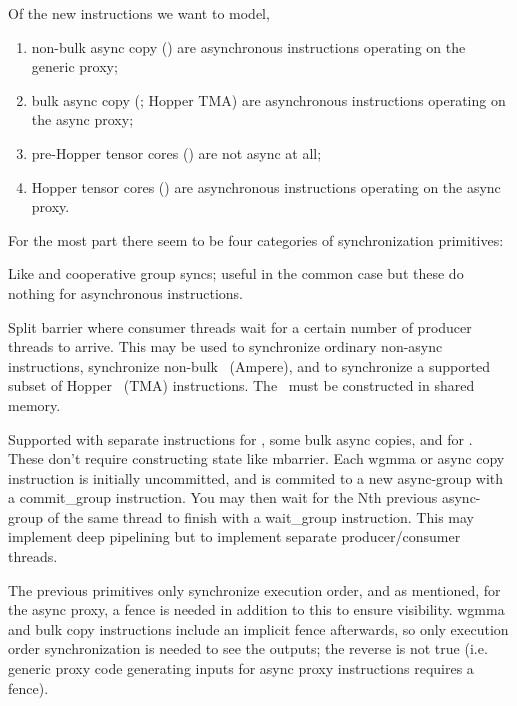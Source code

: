 \filbreak
Of the new instructions we want to model,

\begin{enumerate}
  \item non-bulk async copy (\cpAsync) are asynchronous instructions operating on the generic proxy;
  \item bulk async copy (\cpAsyncBulk; Hopper TMA) are asynchronous instructions operating on the async proxy;
  \item pre-Hopper tensor cores () are not async at all;
  \item Hopper tensor cores (\wgmma) are asynchronous instructions operating on the async proxy.
\end{enumerate}

\filbreak
For the most part there seem to be four categories of synchronization primitives:

\filbreak
{} Like  and cooperative group syncs; useful in the common case but these do nothing for asynchronous instructions.

\filbreak
{} Split barrier where consumer threads wait for a certain number of producer threads to arrive. This may be used to synchronize ordinary non-async instructions, synchronize non-bulk \cpAsync\ (Ampere), and to synchronize a supported subset of Hopper \cpAsyncBulk\ (TMA) instructions. The \mbarrier\ must be constructed in shared memory.

\filbreak
{} Supported with separate instructions for , some bulk async copies, and for . These don't require constructing state like mbarrier. Each wgmma or async copy instruction is initially uncommitted, and is commited to a new async-group with a commit\_group instruction. You may then wait for the Nth previous async-group of the same thread to finish with a wait\_group instruction. This may implement deep pipelining but  to implement separate producer/consumer threads.

\filbreak
{} The previous primitives only synchronize execution order, and as mentioned, for the async proxy, a fence is needed in addition to this to ensure visibility. wgmma and bulk copy instructions include an implicit fence afterwards, so only execution order synchronization is needed to see the outputs; the reverse is not true (i.e. generic proxy code generating inputs for async proxy instructions requires a fence).

